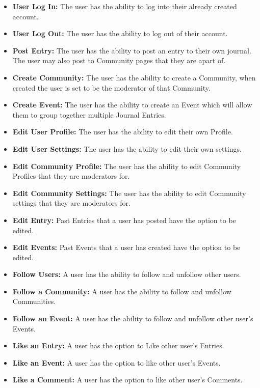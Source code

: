 \documentclass[letterpaper, 10, draftclsnofoot, onecolumn]{IEEEtran}
\begin{document}
\begin{itemize} 

\item \textbf{User Log In: } The user has the ability to log into their already created account.
\item \textbf{User Log Out: } The user has the ability to log out of their account.

\item \textbf{Post Entry: } The user has the ability to post an entry to their own journal. The user may also post to Community pages that they are apart of. 
 
\item \textbf{Create Community: } The user has the ability to create a Community, when created the user is set to be the moderator of that Community.
\item \textbf{Create Event: } The user has the ability to create an Event which will allow them to group together multiple Journal Entries.

\item \textbf{Edit User Profile: } The user has the ability to edit their own Profile.
\item \textbf{Edit User Settings: } The user has the ability to edit their own settings.
\item \textbf{Edit Community Profile: } The user has the ability to edit Community Profiles that they are moderators for.
\item \textbf{Edit Community Settings: } The user has the ability to edit Community settings that they are moderators for.
\item \textbf{Edit Entry: } Past Entries that a user has posted have the option to be edited.
\item \textbf{Edit Events: } Past Events that a user has created have the option to be edited.

\item \textbf{Follow Users: } A user has the ability to follow and unfollow other users.
\item \textbf{Follow a Community: } A user has the ability to follow and unfollow Communities.
\item \textbf{Follow an Event: } A user has the ability to follow and unfollow other user's Events.

\item \textbf{Like an Entry: } A user has the option to Like other user's Entries.
\item \textbf{Like an Event: } A user has the option to like other user's Events.
\item \textbf{Like a Comment: } A user has the option to like other user's Comments.


\end{itemize}
\end{document}
